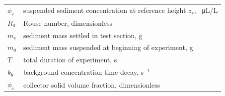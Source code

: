 \documentclass[geosciences,article,submit,moreauthors,pdftex]{Definitions/mdpi}
\begin{document}
{\begin{tabular}{@{}ll}
 $\phi_r$ & suspended sediment concentration at reference height $z_r$, \SI{}{\micro\liter/\liter} \\
 $R_0$ & Rouse number, dimensionless \\
 $m_s$ & sediment mass settled in test section, g \\
 $m_0$ & sediment mass suspended at beginning of experiment, g \\
 $T$ & total duration of experiment, s \\
 $k_b$ & background concentration time-decay, s$^{-1}$ \\
 $\phi_c$ & collector solid volume fraction, dimensionless \\
 \end{tabular}}




\end{document}
